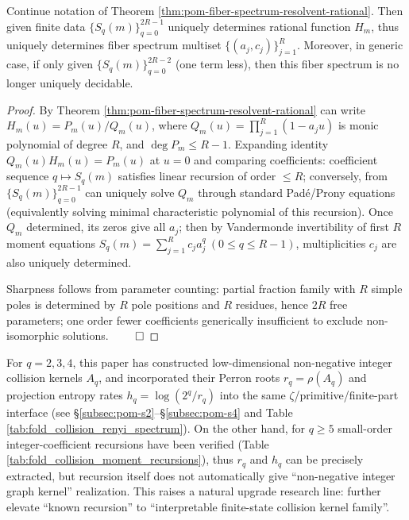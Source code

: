 \begin{theorem}\label{thm:pom-fiber-spectrum-finite-reconstruction-sharp}
Continue notation of Theorem \ref{thm:pom-fiber-spectrum-resolvent-rational}.
Then given finite data
\(
\{S_q(m)\}_{q=0}^{2R-1}
\)
uniquely determines rational function \(H_m\), thus uniquely determines fiber spectrum multiset \(\{(a_j,c_j)\}_{j=1}^{R}\).
Moreover, in generic case, if only given \(\{S_q(m)\}_{q=0}^{2R-2}\) (one term less), then this fiber spectrum is no longer uniquely decidable.
\end{theorem}
\begin{proof}
By Theorem \ref{thm:pom-fiber-spectrum-resolvent-rational} can write \(H_m(u)=P_m(u)/Q_m(u)\), where
\(
Q_m(u)=\prod_{j=1}^{R}(1-a_j u)
\)
is monic polynomial of degree \(R\), and \(\deg P_m\le R-1\).
Expanding identity \(Q_m(u)H_m(u)=P_m(u)\) at \(u=0\) and comparing coefficients: coefficient sequence \(q\mapsto S_q(m)\) satisfies linear recursion of order \(\le R\); conversely, from \(\{S_q(m)\}_{q=0}^{2R-1}\) can uniquely solve \(Q_m\) through standard Pad\'e/Prony equations (equivalently solving minimal characteristic polynomial of this recursion).
Once \(Q_m\) determined, its zeros give all \(a_j\);
then by Vandermonde invertibility of first \(R\) moment equations \(S_q(m)=\sum_{j=1}^{R}c_j a_j^q\ (0\le q\le R-1)\), multiplicities \(c_j\) are also uniquely determined.
\par
Sharpness follows from parameter counting: partial fraction family with \(R\) simple poles is determined by \(R\) pole positions and \(R\) residues, hence \(2R\) free parameters; one order fewer coefficients generically insufficient to exclude non-isomorphic solutions. $\qed$
\end{proof}
\par
For \(q=2,3,4\), this paper has constructed low-dimensional non-negative integer collision kernels \(A_q\), and incorporated their Perron roots \(r_q=\rho(A_q)\) and projection entropy rates \(h_q=\log(2^q/r_q)\) into the same \(\zeta\)/primitive/finite-part interface (see \S\ref{subsec:pom-s2}--\S\ref{subsec:pom-s4} and Table \ref{tab:fold_collision_renyi_spectrum}).
On the other hand, for \(q\ge 5\) small-order integer-coefficient recursions have been verified (Table \ref{tab:fold_collision_moment_recursions}), thus \(r_q\) and \(h_q\) can be precisely extracted, but recursion itself does not automatically give ``non-negative integer graph kernel'' realization.
This raises a natural upgrade research line: further elevate ``known recursion'' to ``interpretable finite-state collision kernel family''.

